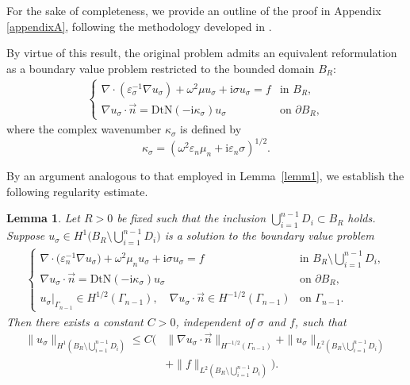 \documentclass[12pt,reqno]{amsart}
\newtheorem{lemma}[theorem]{Lemma}
\numberwithin{equation}{section}
\begin{document}
For the sake of completeness, we provide an outline of the proof in Appendix \ref{appendixA}, following the methodology developed in \cite{gräßle2025}.

By virtue of this result, the original problem admits an equivalent reformulation as a boundary value problem restricted to the bounded domain $B_{R}$:
\begin{align}\label{eq37}
\begin{cases}
\nabla\cdot(\varepsilon_\sigma^{-1}\nabla u_\sigma) + \omega^2\mu u_\sigma + \mathrm{i}\sigma u_\sigma = f & \text{in } B_{R}, \\[4pt]
\nabla u_\sigma\cdot\vec{n}= \mathrm{DtN}(-\mathrm{i}\kappa_\sigma) u_\sigma & \text{on } \partial B_{R},
\end{cases}
\end{align}
where the complex wavenumber $\kappa_\sigma$ is defined by
\[
\kappa_\sigma = \left(\omega^2\varepsilon_n\mu_n + \mathrm{i}\varepsilon_n\sigma\right)^{1/2}.
\]



By an argument analogous to that employed in Lemma~\ref{lemm1}, we establish the following regularity estimate.

\begin{lemma}\label{lemma2}
Let $R>0$ be fixed such that the inclusion $\bigcup_{i=1}^{n-1} D_i \subset B_{R}$ holds. Suppose $u_\sigma \in H^1\bigl(B_{R} \setminus \bigcup_{i=1}^{n-1} D_i\bigr)$ is a solution to the boundary value problem
\begin{align*}
\begin{cases}
\nabla \cdot \bigl(\varepsilon_n^{-1} \nabla u_\sigma\bigr) + \omega^2 \mu_n u_\sigma + \mathrm{i}\sigma u_\sigma = f & \text{in } B_{R} \setminus \bigcup_{i=1}^{n-1} D_i, \\[6pt]
\nabla u_\sigma\cdot\vec{n} = \mathrm{DtN}(-\mathrm{i}\kappa_\sigma)u_\sigma & \text{on } \partial B_{R}, \\[6pt]
u_\sigma|_{\Gamma_{n-1}} \in H^{1/2}(\Gamma_{n-1}), \quad \nabla u_\sigma\cdot\vec{n} \in H^{-1/2}(\Gamma_{n-1}) & \text{on } \Gamma_{n-1}.
\end{cases}
\end{align*}
Then there exists a constant $C > 0$, independent of $\sigma$ and $f$, such that
\begin{align*}
\|u_\sigma\|_{H^1\left(B_{R} \setminus \bigcup_{i=1}^{n-1} D_i\right)} \le C \biggl( &\|\nabla u_\sigma\cdot\vec{n}\|_{H^{-1/2}(\Gamma_{n-1})} + \|u_\sigma\|_{L^2\left(B_{R} \setminus \bigcup_{i=1}^{n-1} D_i\right)} \\
&+ \|f\|_{L^2\left(B_{R} \setminus \bigcup_{i=1}^{n-1} D_i\right)} \biggr).
\end{align*}
\end{lemma}
\end{document}
